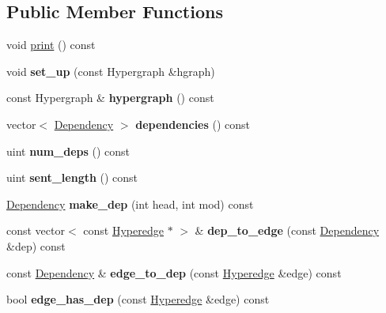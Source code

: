 \subsection*{Public Member Functions}
\begin{DoxyCompactItemize}
\item 
void \hyperlink{class_dep_parser_a9aebbbde821bad423b6c01cc12f02a2c}{print} () const 
\item 
\hypertarget{class_dep_parser_a6131e95a8ec7b07f7a4d68dae224d52f}{
void {\bfseries set\_\-up} (const Hypergraph \&hgraph)}
\label{class_dep_parser_a6131e95a8ec7b07f7a4d68dae224d52f}

\item 
\hypertarget{class_dep_parser_aaec31758432c2d3336d2164996571688}{
const Hypergraph \& {\bfseries hypergraph} () const }
\label{class_dep_parser_aaec31758432c2d3336d2164996571688}

\item 
\hypertarget{class_dep_parser_aa64f67830bf4c3bf9936ba6056dfdff0}{
vector$<$ \hyperlink{struct_dependency}{Dependency} $>$ {\bfseries dependencies} () const }
\label{class_dep_parser_aa64f67830bf4c3bf9936ba6056dfdff0}

\item 
\hypertarget{class_dep_parser_aaff55cf38fd9b1fbfb22090ddeb72ba8}{
uint {\bfseries num\_\-deps} () const }
\label{class_dep_parser_aaff55cf38fd9b1fbfb22090ddeb72ba8}

\item 
\hypertarget{class_dep_parser_a86b99d09d76b7d6f8733b208e9f32822}{
uint {\bfseries sent\_\-length} () const }
\label{class_dep_parser_a86b99d09d76b7d6f8733b208e9f32822}

\item 
\hypertarget{class_dep_parser_a49afcb1a83a3c924869faf34cd9e968e}{
\hyperlink{struct_dependency}{Dependency} {\bfseries make\_\-dep} (int head, int mod) const }
\label{class_dep_parser_a49afcb1a83a3c924869faf34cd9e968e}

\item 
\hypertarget{class_dep_parser_a9fa2f0bf24cd870404f0a99b5926c558}{
const vector$<$ const \hyperlink{class_scarab_1_1_h_g_1_1_hyperedge}{Hyperedge} $\ast$ $>$ \& {\bfseries dep\_\-to\_\-edge} (const \hyperlink{struct_dependency}{Dependency} \&dep) const }
\label{class_dep_parser_a9fa2f0bf24cd870404f0a99b5926c558}

\item 
\hypertarget{class_dep_parser_aa5ff87f99326c60633fb8e26d1737776}{
const \hyperlink{struct_dependency}{Dependency} \& {\bfseries edge\_\-to\_\-dep} (const \hyperlink{class_scarab_1_1_h_g_1_1_hyperedge}{Hyperedge} \&edge) const }
\label{class_dep_parser_aa5ff87f99326c60633fb8e26d1737776}

\item 
\hypertarget{class_dep_parser_abd0b9171e59c1c40cdb58807a46a5449}{
bool {\bfseries edge\_\-has\_\-dep} (const \hyperlink{class_scarab_1_1_h_g_1_1_hyperedge}{Hyperedge} \&edge) const }
\label{class_dep_parser_abd0b9171e59c1c40cdb58807a46a5449}

\end{DoxyCompactItemize}
